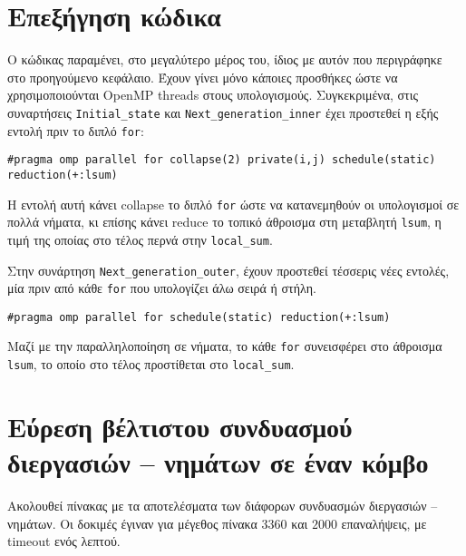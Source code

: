 \section{Επεξήγηση κώδικα}
\begin{multicols}{2}
Ο κώδικας παραμένει, στο μεγαλύτερο μέρος του, ίδιος με αυτόν που περιγράφηκε στο προηγούμενο κεφάλαιο. Έχουν γίνει μόνο κάποιες προσθήκες ώστε να χρησιμοποιούνται OpenMP threads στους υπολογισμούς. Συγκεκριμένα, στις συναρτήσεις \texttt{Initial_state} και \texttt{Next_generation_inner} έχει προστεθεί η εξής εντολή πριν το διπλό \texttt{for}: \\
\end{multicols}

\begin{tcolorbox}
\texttt{#pragma}\texttt{ omp parallel for collapse(2) private(i,j) schedule(static) reduction(+:lsum)}
\end{tcolorbox}
\begin{multicols}{2}
Η εντολή αυτή κάνει collapse  το διπλό \texttt{for} ώστε να κατανεμηθούν οι υπολογισμοί σε πολλά νήματα, κι επίσης κάνει reduce το τοπικό άθροισμα στη μεταβλητή \texttt{lsum}, η τιμή της οποίας στο τέλος περνά στην \texttt{local_sum}. \par

Στην συνάρτηση \texttt{Next_generation_outer}, έχουν προστεθεί τέσσερις νέες εντολές, μία πριν από κάθε \texttt{for} που υπολογίζει άλω σειρά ή στήλη. \\
\end{multicols}

\begin{tcolorbox}
\texttt{#pragma}\texttt{ omp parallel for schedule(static) reduction(+:lsum)}
\end{tcolorbox}
Μαζί με την παραλληλοποίηση σε νήματα, το κάθε \texttt{for} συνεισφέρει στο άθροισμα \texttt{lsum}, το οποίο στο τέλος προστίθεται στο \texttt{local_sum}.

\section{Εύρεση βέλτιστου συνδυασμού διεργασιών -- νημάτων σε έναν κόμβο}

Ακολουθεί πίνακας με τα αποτελέσματα των διάφορων συνδυασμών διεργασιών -- νημάτων. Οι δοκιμές έγιναν για μέγεθος πίνακα $3360$ και $2000$ επαναλήψεις, με timeout ενός λεπτού.

